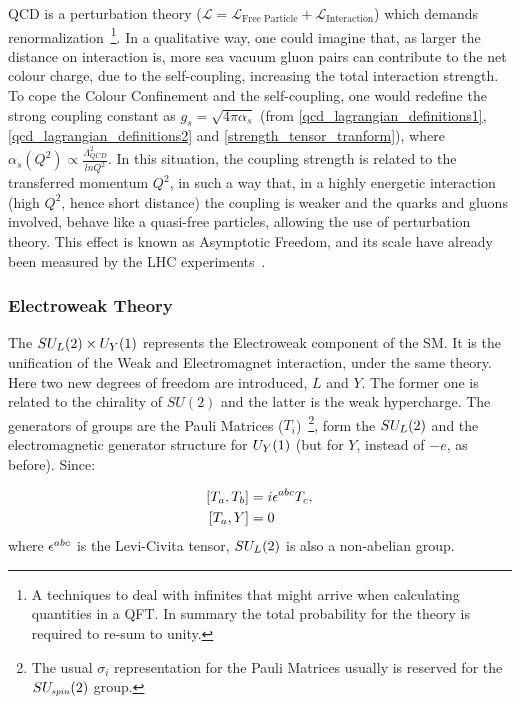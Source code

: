 QCD is a perturbation theory ($\mathcal{L} = \mathcal{L}_{\text{Free Particle}} + \mathcal{L}_{\text{Interaction}}$) which demands renormalization~\footnote{A techniques to deal with infinites that might arrive when calculating quantities in a QFT. In summary the total probability for the theory is required to re-sum to unity.}. In a qualitative way, one could imagine that, as larger the distance on interaction is, more sea vacuum gluon pairs can contribute to the net colour charge, due to the self-coupling, increasing the total interaction strength. To cope the Colour Confinement and the self-coupling, one would redefine the strong coupling constant as $g_s = \sqrt{4 \pi \alpha_s}$ (from \ref{qcd_lagrangian_definitions1}, \ref{qcd_lagrangian_definitions2} and \ref{strength_tensor_tranform}), where $\alpha_s(Q^2) \propto \frac{\Lambda^2_{QCD}}{ln Q^2}$. In this situation, the coupling strength is related to the transferred momentum $Q^2$, in such a way that, in a highly energetic interaction (high $Q^2$, hence short distance) the coupling is weaker and the quarks and gluons involved, behave like a quasi-free particles, allowing the use of perturbation theory. This effect is known as Asymptotic Freedom, and its scale have already been measured by the LHC experiments~\cite{pdg_2020}.

\subsubsection{Electroweak Theory}

The $SU_{\scaleto{L}{5pt}}(2) \times U_{\scaleto{Y}{5pt}}(1)$ represents the Electroweak component of the SM. It is the unification of the Weak and Electromagnet interaction, under the same theory. Here two new degrees of freedom are introduced, $L$ and $Y$. The former one is related to the chirality of $SU(2)$ and the latter is the weak hypercharge. The generators of groups are the Pauli Matrices ($T_i$)~\footnote{The usual $\sigma_i$ representation for the Pauli Matrices usually is reserved for the $SU_{\scaleto{spin}{5pt}}(2)$ group.}, form the $SU_{\scaleto{L}{5pt}}(2)$ and the electromagnetic generator structure for $U_{\scaleto{Y}{5pt}}(1)$ (but for $Y$, instead of $-e$, as before). Since:

\begin{equation}
    \begin{split}
        \left[ T_a, T_b \right] &=  i \levicivita{^{abc}}T_c,  \\
        \left[ T_a, Y \right] &=  0
    \end{split}
\label{pauli_commutator}
\end{equation}
where $\levicivita{^{abc}}$ is the Levi-Civita tensor, $SU_{\scaleto{L}{5pt}}(2)$ is also a non-abelian group.


